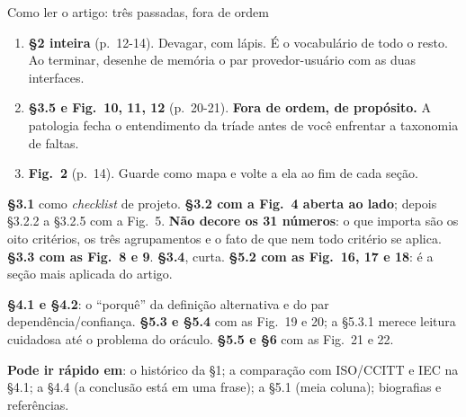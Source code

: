 \documentclass{beamer}
\begin{document}
\begin{frame}{Como ler o artigo: tr\^es passadas, fora de ordem}
    \scriptsize
    \begin{tcolorbox}[colback=depAzul!5,colframe=depAzul!65,boxrule=0.6pt,title={\scriptsize\bfseries Passada 1, cerca de 60 min: o esqueleto}]
        \scriptsize
        \begin{enumerate}
            \item \textbf{\S2 inteira} (p.\ 12-14). Devagar, com l\'apis. \'E o vocabul\'ario de todo o resto. Ao terminar, desenhe de mem\'oria o par provedor-usu\'ario com as duas interfaces.
            \item \textbf{\S3.5 e Fig.\ 10, 11, 12} (p.\ 20-21). \textbf{Fora de ordem, de prop\'osito.} A patologia fecha o entendimento da tr\'iade antes de voc\^e enfrentar a taxonomia de faltas.
            \item \textbf{Fig.\ 2} (p.\ 14). Guarde como mapa e volte a ela ao fim de cada se\c{c}\~ao.
        \end{enumerate}
    \end{tcolorbox}
    \smallskip
    \begin{tcolorbox}[colback=depVerde!6,colframe=depVerde!60,boxrule=0.6pt,title={\scriptsize\bfseries Passada 2, cerca de 90 min: as tr\^es grandes classifica\c{c}\~oes}]
        \scriptsize
        \textbf{\S3.1} como \textit{checklist} de projeto. \textbf{\S3.2 com a Fig.\ 4 aberta ao lado}; depois \S3.2.2 a \S3.2.5 com a Fig.\ 5. \textbf{N\~ao decore os 31 n\'umeros}: o que importa s\~ao os oito crit\'erios, os tr\^es agrupamentos e o fato de que nem todo crit\'erio se aplica. \textbf{\S3.3 com as Fig.\ 8 e 9}. \textbf{\S3.4}, curta. \textbf{\S5.2 com as Fig.\ 16, 17 e 18}: \'e a se\c{c}\~ao mais aplicada do artigo.
    \end{tcolorbox}
    \smallskip
    \begin{tcolorbox}[colback=depLaranja!8,colframe=depLaranja!70,boxrule=0.6pt,title={\scriptsize\bfseries Passada 3, cerca de 60 min: completar e comparar}]
        \scriptsize
        \textbf{\S4.1 e \S4.2}: o ``porqu\^e'' da defini\c{c}\~ao alternativa e do par depend\^encia/confian\c{c}a. \textbf{\S5.3 e \S5.4} com as Fig.\ 19 e 20; a \S5.3.1 merece leitura cuidadosa at\'e o problema do or\'aculo. \textbf{\S5.5 e \S6} com as Fig.\ 21 e 22.
    \end{tcolorbox}
    \smallskip
    {\scriptsize \textbf{Pode ir r\'apido em}: o hist\'orico da \S1; a compara\c{c}\~ao com ISO/CCITT e IEC na \S4.1; a \S4.4 (a conclus\~ao est\'a em uma frase); a \S5.1 (meia coluna); biografias e refer\^encias.}
\end{frame}
\end{document}
